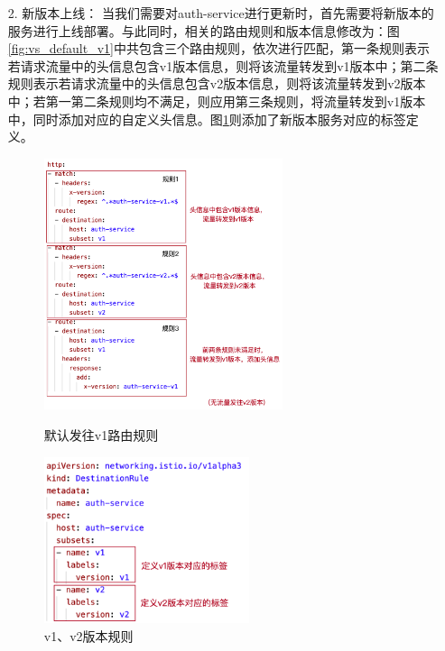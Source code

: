 \documentclass[12pt,a4paper]{article}
\theoremstyle{definition}
\begin{document}
\begin{enumerate}
	\item [2.] 新版本上线：
	当我们需要对auth-service进行更新时，首先需要将新版本的服务进行上线部署。与此同时，相关的路由规则和版本信息修改为：图\ref{fig:vs_default_v1}中共包含三个路由规则，依次进行匹配，第一条规则表示若请求流量中的头信息包含v1版本信息，则将该流量转发到v1版本中；第二条规则表示若请求流量中的头信息包含v2版本信息，则将该流量转发到v2版本中；若第一第二条规则均不满足，则应用第三条规则，将流量转发到v1版本中，同时添加对应的自定义头信息。图\ref{fig:dr_v1v2}则添加了新版本服务对应的标签定义。
	\begin{figure}[htbp]
	\centering
	\begin{minipage}[t]{0.48\textwidth}
	\centering
	\centerline{\includegraphics[width=7cm]{vs_default_v1.png}}
	\caption{默认发往v1路由规则}
	\label{fig:vs_default_v1}
	\end{minipage}
	\begin{minipage}[t]{0.48\textwidth}
	\centering
	\centerline{\includegraphics[width=6cm]{dr_v1v2.png}}
	\caption{v1、v2版本规则}
	\label{fig:dr_v1v2}
	\end{minipage}
	\end{figure}


\end{enumerate}
\end{document}
